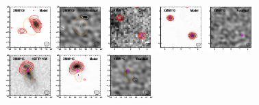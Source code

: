 \documentclass[iop]{emulateapj}
\begin{document}
\begin{figure}[!tbp]
\begin{centering}
\includegraphics[width=0.162\textwidth]{../Figures/modelfit/XMM109_model_bestfit.pdf}
\includegraphics[width=0.162\textwidth]{../Figures/modelfit/XMM109_residual_bestfit.pdf}
\includegraphics[width=0.162\textwidth]{../Figures/modelfit/XMM110_optical_bestfit.pdf}
\includegraphics[width=0.162\textwidth]{../Figures/modelfit/XMM110_model_bestfit.pdf}
\includegraphics[width=0.162\textwidth]{../Figures/modelfit/XMM110_residual_bestfit.pdf}
\includegraphics[width=0.162\textwidth]{../Figures/modelfit/XMM115_optical_bestfit.pdf}
\includegraphics[width=0.162\textwidth]{../Figures/modelfit/XMM115_model_bestfit.pdf}
\includegraphics[width=0.162\textwidth]{../Figures/modelfit/XMM115_residual_bestfit.pdf}

\end{centering}
\end{figure}
\end{document}

